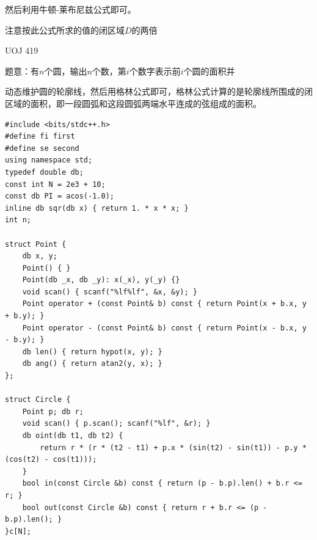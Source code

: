然后利用牛顿-莱布尼兹公式即可。\par

注意按此公式所求的值的闭区域$D$的两倍\par


UOJ 419\par
题意：有$n$个圆，输出$n$个数，第$i$个数字表示前$i$个圆的面积并\par

动态维护圆的轮廓线，然后用格林公式即可，格林公式计算的是轮廓线所围成的闭区域的面积，即一段圆弧和这段圆弧两端水平连成的弦组成的面积。\par

\begin{lstlisting}
#include <bits/stdc++.h>
#define fi first
#define se second
using namespace std;
typedef double db;
const int N = 2e3 + 10;
const db PI = acos(-1.0);
inline db sqr(db x) { return 1. * x * x; }
int n;

struct Point {
    db x, y;
    Point() { }
    Point(db _x, db _y): x(_x), y(_y) {}
	void scan() { scanf("%lf%lf", &x, &y); }
    Point operator + (const Point& b) const { return Point(x + b.x, y + b.y); }
    Point operator - (const Point& b) const { return Point(x - b.x, y - b.y); }
	db len() { return hypot(x, y); }
	db ang() { return atan2(y, x); }
};

struct Circle {
	Point p; db r;
	void scan() { p.scan(); scanf("%lf", &r); }
	db oint(db t1, db t2) {
		return r * (r * (t2 - t1) + p.x * (sin(t2) - sin(t1)) - p.y * (cos(t2) - cos(t1)));
	}
	bool in(const Circle &b) const { return (p - b.p).len() + b.r <= r; }
	bool out(const Circle &b) const { return r + b.r <= (p - b.p).len(); }
}c[N];


\end{lstlisting}
